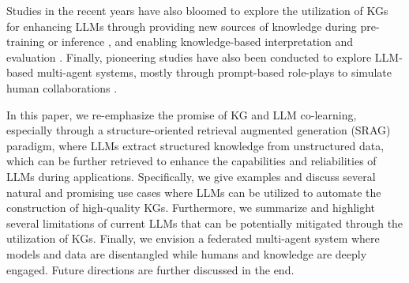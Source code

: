 Studies in the recent years have also bloomed to explore the utilization of KGs for enhancing LLMs through providing new sources of knowledge during pre-training \cite{hu2023survey, wei2021knowledge, yin2022survey, wang2023unifying, sun2022jointlk, liu2021kg, qi2021answering, mavromatis2024gnn, zhang2022greaselm, feng2020scalable, yasunaga2021qa, zhang2019ernie, sun2021ernie, liu2020k, dai2022knowledge, shen2020exploiting, zhang2020bert, tian2020skep, rosset2020knowledge, li2022pre, xiong2020pretrained, he2020bert, su2021cokebert, zhu2023pre, feng2023knowledge, huang2022endowing, agarwal2021knowledge, xu2023kilm, oguz2022unik, tan2024walklm, xu2024bmretriever,sun2020colake, zhang2022dkplm, ye2022ontology, luo2023chatkbqa, martino2023knowledge, chen2020kgpt, santos2022knowledge, moiseev2022skill} or inference \cite{li2023graph, jiang2023unikgqa, luo2024reasoning, sun2024think, wang2024reasoning, luo2023chatrule, wang2023enhancing, besta2024graph, wang2019improving, wang2024knowledge, allemang2024increasing, ji2023rho, feng2023factkb, mcdonald2024reducing, lee2022promptiverse, brate2022improving, wen2023mindmap, wilmot2021memory, logan2019barack, wu2022efficient, guan2024mitigating, dong2024don, sarthi2024raptor, he2024g, han2023pive, edge2024local, gutierrez2024hipporag, liang2024empowering}, and enabling knowledge-based interpretation and evaluation \cite{petroni2019language, jiang2020can, adolphs2021query, shin2020autoprompt, mallen2022not, cohen2023qa, luo2023systematic, liu2023evaluating, orogat2021cbench, zhu2023dyval, bai2024kgquiz, ho2020constructing}. 
Finally, pioneering studies have also been conducted to explore LLM-based multi-agent systems, mostly through prompt-based role-plays to simulate human collaborations \cite{tracy2018agent, tang2024medagents, kaur2024llm, li2024agent, kim2024adaptive, gebreab2024llm, yue2024ct, pan2024agentcoord, xiao2024cellagent}. 

{In this paper, we re-emphasize the promise of KG and LLM co-learning, especially through a structure-oriented retrieval augmented generation (SRAG) paradigm, where LLMs extract structured knowledge from unstructured data, which can be further retrieved to enhance the capabilities and reliabilities of LLMs during applications.}
Specifically, we give examples and discuss several natural and promising use cases where LLMs can be utilized to automate the construction of high-quality KGs. Furthermore, we summarize and highlight several limitations of current LLMs that can be potentially mitigated through the utilization of KGs. Finally, we envision a federated multi-agent system where models and data are disentangled while humans and knowledge are deeply engaged. Future directions are further discussed in the end.